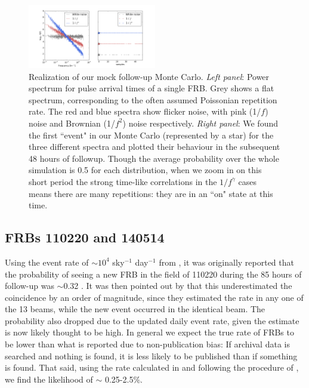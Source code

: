 \documentclass[useAMS,usenatbib]{mn2e}
\begin{document}
\begin{figure}
  \centering
   \includegraphics[trim={.5in, 0in, .5in, 0in}, width=0.5\textwidth, height=0.27\textwidth]{frb_sim_pink24.png}
   \caption{Realization of our mock follow-up Monte Carlo. \textit{Left panel}: Power spectrum for pulse arrival times of a single FRB.
   Grey shows a flat spectrum, corresponding to the often assumed Poissonian 
   repetition rate. The red and blue spectra show flicker noise, with pink (1/$f$) 
   noise and Brownian (1/$f^2$) noise respectively. \textit{Right panel}: 
   We found the first ``event" in our Monte Carlo (represented by a star) for the three different spectra 
   and plotted their behaviour in the subsequent 48 hours of followup. Though the average
   probability over the whole simulation is 0.5 for each distribution, when we zoom in 
   on this short period the strong time-like correlations 
   in the $1/f^\gamma$ cases means there are many repetitions: they are in an ``on" state at this time.}
   \label{FIG-RATE}
\end{figure}


\subsection{FRBs 110220 and 140514}
Using the event rate of $\sim10^4$ sky$^{-1}$ day$^{-1}$
from \cite{2013Sci...341...53T}, it 
was originally reported that the probability of seeing a 
new FRB in the field of 110220 during the 85 hours of follow-up 
was $\sim$0.32  
\citep{2015MNRAS.447..246P}. It was then pointed out by \cite{2015arXiv150701002M} 
that this underestimated the coincidence by an order of magnitude, 
since they estimated the rate in any one of the 13 beams, 
while the new event occurred in the identical beam.
The probability also dropped due to the updated daily event rate,
given the \cite{2013Sci...341...53T} estimate is now likely thought to be high.
In general we expect the true rate of FRBs to be lower than what is 
reported due to non-publication bias: If archival data is searched and 
nothing is found, it is less likely to be published than if something is found. 
That said, using the rate calculated in \cite{2015arXiv150500834R} and following
the procedure of \cite{2015arXiv150701002M}, we find the likelihood of 
$\sim$ 0.25-2.5$\%$.
\end{document}

